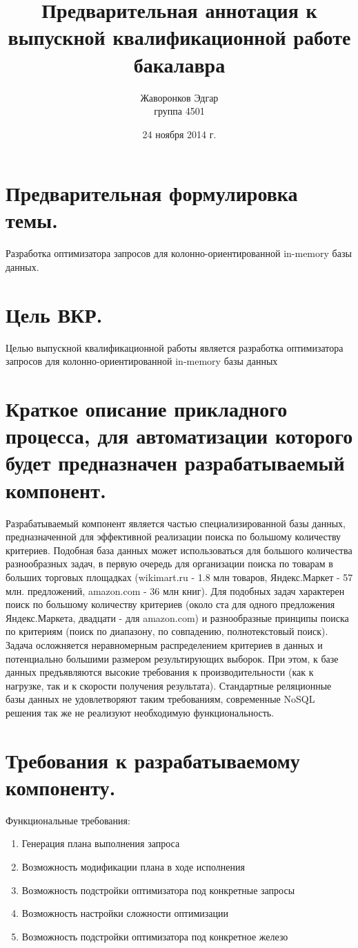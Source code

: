 \documentclass[12pt]{article}
\author{Жаворонков Эдгар \\ группа 4501}
\title{Предварительная аннотация к выпускной квалификационной работе бакалавра}
\date{24 ноября 2014 г.}
\begin{document}
    \section{Предварительная формулировка темы.}
        Разработка оптимизатора запросов для колонно-ориентированной in-memory базы данных.
    \section{Цель ВКР.}
        Целью выпускной квалификационной работы является разработка оптимизатора запросов для колонно-ориентированной in-memory базы данных
    \section{Краткое описание прикладного процесса, для автоматизации которого будет предназначен разрабатываемый компонент.}
        Разрабатываемый компонент является частью специализированной базы данных, предназначенной для эффективной
        реализации поиска по большому количеству критериев. Подобная база данных может использоваться для большого
        количества разнообразных задач, в первую очередь для организации поиска по товарам в больших торговых
        площадках (wikimart.ru - 1.8 млн товаров, Яндекс.Маркет - 57 млн. предложений, amazon.com - 36 млн книг). Для
        подобных задач характерен поиск по большому количеству критериев (около ста для одного предложения
        Яндекс.Маркета, двадцати - для amazon.com) и разнообразные принципы поиска по критериям (поиск по диапазону,
        по совпадению, полнотекстовый поиск). Задача осложняется неравномерным распределением критериев в данных
        и потенциально большими размером результирующих выборок. При этом, к базе данных предъявляются высокие
        требования к производительности (как к нагрузке, так и к скорости получения результата). Стандартные
        реляционные базы данных не удовлетворяют таким требованиям, современные NoSQL решения так же не реализуют
        необходимую функциональность.
    \section{Требования к разрабатываемому компоненту.}
        Функциональные требования:
        \begin{enumerate}\itemsep1pt \parskip0pt 
            \item Генерация плана выполнения запроса
            \item Возможность модификации плана в ходе исполнения
            \item Возможность подстройки оптимизатора под конкретные запросы
            \item Возможность настройки сложности оптимизации
            \item Возможность подстройки оптимизатора под конкретное железо
        \end{enumerate}
        
\end{document}
